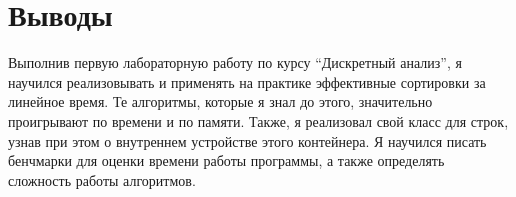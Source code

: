 \section{Выводы}

Выполнив первую лабораторную работу по курсу \enquote{Дискретный анализ}, я научился реализовывать и применять на практике эффективные сортировки за линейное время. Те алгоритмы, которые я знал до этого, значительно проигрывают по времени и по памяти. Также, я реализовал свой класс для строк, узнав при этом о внутреннем устройстве этого контейнера. Я научился писать бенчмарки для оценки времени работы программы, а также определять сложность работы алгоритмов.   
\pagebreak